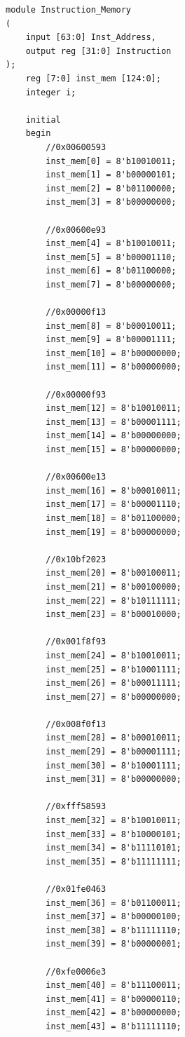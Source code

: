 \documentclass{article}
\begin{document}
\begin{lstlisting}[caption={Changes to Instruction Memory}, captionpos=b, language=RISC-V]
    module Instruction_Memory
(
	input [63:0] Inst_Address,
	output reg [31:0] Instruction
);
	reg [7:0] inst_mem [124:0];
	integer i;
	
	initial
	begin
        //0x00600593
        inst_mem[0] = 8'b10010011;
        inst_mem[1] = 8'b00000101;
        inst_mem[2] = 8'b01100000;
        inst_mem[3] = 8'b00000000;
        
        //0x00600e93
        inst_mem[4] = 8'b10010011;
        inst_mem[5] = 8'b00001110;
        inst_mem[6] = 8'b01100000;
        inst_mem[7] = 8'b00000000;
        
        //0x00000f13
        inst_mem[8] = 8'b00010011;
        inst_mem[9] = 8'b00001111;
        inst_mem[10] = 8'b00000000;
        inst_mem[11] = 8'b00000000;
        
        //0x00000f93
        inst_mem[12] = 8'b10010011;
        inst_mem[13] = 8'b00001111;
        inst_mem[14] = 8'b00000000;
        inst_mem[15] = 8'b00000000;
        
        //0x00600e13
        inst_mem[16] = 8'b00010011;
        inst_mem[17] = 8'b00001110;
        inst_mem[18] = 8'b01100000;
        inst_mem[19] = 8'b00000000;
        
        //0x10bf2023
        inst_mem[20] = 8'b00100011;
        inst_mem[21] = 8'b00100000;
        inst_mem[22] = 8'b10111111;
        inst_mem[23] = 8'b00010000;
        
        //0x001f8f93
        inst_mem[24] = 8'b10010011;
        inst_mem[25] = 8'b10001111;
        inst_mem[26] = 8'b00011111;
        inst_mem[27] = 8'b00000000;
        
        //0x008f0f13
        inst_mem[28] = 8'b00010011;
        inst_mem[29] = 8'b00001111;
        inst_mem[30] = 8'b10001111;
        inst_mem[31] = 8'b00000000;
        
        //0xfff58593
        inst_mem[32] = 8'b10010011;
        inst_mem[33] = 8'b10000101;
        inst_mem[34] = 8'b11110101;
        inst_mem[35] = 8'b11111111;
        
        //0x01fe0463
        inst_mem[36] = 8'b01100011;
        inst_mem[37] = 8'b00000100;
        inst_mem[38] = 8'b11111110;
        inst_mem[39] = 8'b00000001;
        
        //0xfe0006e3
        inst_mem[40] = 8'b11100011;
        inst_mem[41] = 8'b00000110;
        inst_mem[42] = 8'b00000000;
        inst_mem[43] = 8'b11111110;
        

\end{lstlisting}
\end{document}
